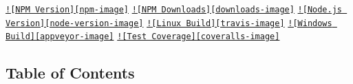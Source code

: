 \href{https://npmjs.org/package/mysql}{\tt !\mbox{[}N\+P\+M Version\mbox{]}\mbox{[}npm-\/image\mbox{]}} \href{https://npmjs.org/package/mysql}{\tt !\mbox{[}N\+P\+M Downloads\mbox{]}\mbox{[}downloads-\/image\mbox{]}} \href{http://nodejs.org/download/}{\tt !\mbox{[}Node.\+js Version\mbox{]}\mbox{[}node-\/version-\/image\mbox{]}} \href{https://travis-ci.org/felixge/node-mysql}{\tt !\mbox{[}Linux Build\mbox{]}\mbox{[}travis-\/image\mbox{]}} \href{https://ci.appveyor.com/project/dougwilson/node-mysql}{\tt !\mbox{[}Windows Build\mbox{]}\mbox{[}appveyor-\/image\mbox{]}} \href{https://coveralls.io/r/felixge/node-mysql?branch=master}{\tt !\mbox{[}Test Coverage\mbox{]}\mbox{[}coveralls-\/image\mbox{]}}

\subsection*{Table of Contents}


